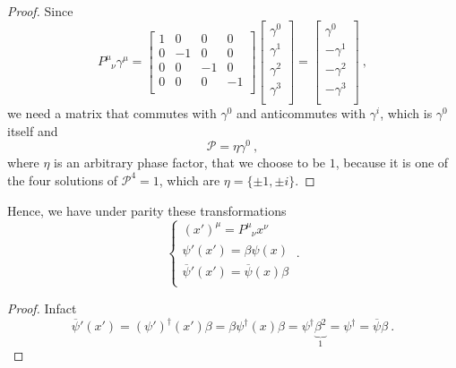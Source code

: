 \begin{proof}
        Since 
        \begin{equation*}
            P^\mu_{\phantom \mu \nu} \gamma^\mu = \begin{bmatrix}
                1 & 0 & 0 & 0 \\
                0 & -1 & 0 & 0 \\
                0 & 0 & -1 & 0 \\
                0 & 0 & 0 & -1 \\
            \end{bmatrix} \begin{bmatrix}
                \gamma^0 \\ \gamma^1 \\ \gamma^2 \\ \gamma^3 \\
            \end{bmatrix} = \begin{bmatrix}
                \gamma^0 \\ - \gamma^1 \\ - \gamma^2 \\ - \gamma^3 \\
            \end{bmatrix} ~,
        \end{equation*}
            we need a matrix that commutes with $\gamma^0$ and anticommutes with $\gamma^i$, which is $\gamma^0$ itself  and 
        \begin{equation*}
            \mathcal P = \eta \gamma^0 ~,
        \end{equation*}
        where $\eta$ is an arbitrary phase factor, that we choose to be $1$, because it is one of the four solutions of $\mathcal P^4 = 1$, which are $\eta = \{\pm 1, \pm i\}$.
    \end{proof}

    Hence, we have under parity these transformations
    \begin{equation*}
        \begin{cases}
            (x')^\mu = P^\mu_{\phantom \mu \nu} x^\nu \\
            \psi' (x') = \beta \psi(x) \\
            \overline \psi'(x') = \overline \psi (x) \beta \\
        \end{cases} ~.
    \end{equation*}
    \begin{proof}
        Infact 
        \begin{equation*}
            \overline \psi' (x') = (\psi')^\dagger (x') \beta = \beta \psi^\dagger (x) \beta = \psi^\dagger \underbrace{\beta^2}_1 = \psi^\dagger = \overline \psi \beta ~.
        \end{equation*}
    \end{proof}

